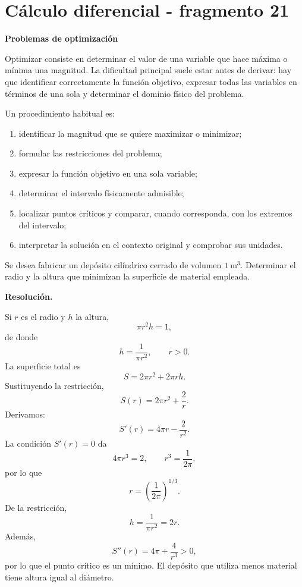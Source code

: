 \section{Cálculo diferencial - fragmento 21}
\textbf{Problemas de optimización}

Optimizar consiste en determinar el valor de una variable que hace máxima o mínima una magnitud. La dificultad principal suele estar antes de derivar: hay que identificar correctamente la función objetivo, expresar todas las variables en términos de una sola y determinar el dominio físico del problema.

Un procedimiento habitual es:
\begin{enumerate}
\item identificar la magnitud que se quiere maximizar o minimizar;
\item formular las restricciones del problema;
\item expresar la función objetivo en una sola variable;
\item determinar el intervalo físicamente admisible;
\item localizar puntos críticos y comparar, cuando corresponda, con los extremos del intervalo;
\item interpretar la solución en el contexto original y comprobar sus unidades.
\end{enumerate}

\begin{solvedexercise}
Se desea fabricar un depósito cilíndrico cerrado de volumen $1\ \mathrm{m}^3$. Determinar el radio y la altura que minimizan la superficie de material empleada.

\textbf{Resolución.}\par\smallskip
Si $r$ es el radio y $h$ la altura,
\[
\pi r^2h=1,
\]
de donde
\[
h=\frac{1}{\pi r^2},
\qquad r>0.
\]
La superficie total es
\[
S=2\pi r^2+2\pi rh.
\]
Sustituyendo la restricción,
\[
S(r)=2\pi r^2+\frac{2}{r}.
\]
Derivamos:
\[
S'(r)=4\pi r-\frac{2}{r^2}.
\]
La condición $S'(r)=0$ da
\[
4\pi r^3=2,
\qquad
r^3=\frac{1}{2\pi},
\]
por lo que
\[
\boxed{r=\left(\frac{1}{2\pi}\right)^{1/3}}.
\]
De la restricción,
\[
h=\frac{1}{\pi r^2}=2r.
\]
Además,
\[
S''(r)=4\pi+\frac{4}{r^3}>0,
\]
por lo que el punto crítico es un mínimo. El depósito que utiliza menos material tiene altura igual al diámetro.
\end{solvedexercise}


